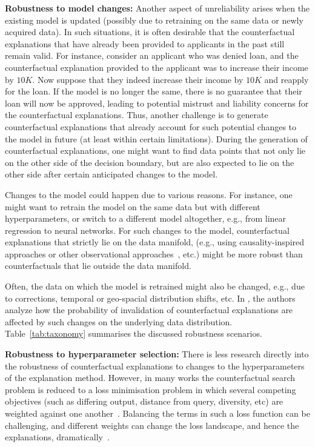 \documentclass[sigconf]{acmart}
\begin{document}
\textbf{Robustness to model changes:} 
Another aspect of unreliability arises when the existing model is updated (possibly due to retraining on the same data or newly acquired data). In such situations, it is often desirable that the counterfactual explanations that have already been provided to applicants in the past still remain valid. For instance, consider an applicant who was denied loan, and the counterfactual explanation provided to the applicant was to increase their income by $10K$. Now suppose that they indeed increase their income by $10K$ and reapply for the loan. If the model is no longer the same, there is no guarantee that their loan will now be approved, leading to potential mistrust and liability concerns for the counterfactual explanations. Thus, another challenge is to generate counterfactual explanations that already account for such potential changes to the model in future (at least within certain limitations). During the generation of counterfactual explanations, one might want to find data points that not only lie on the other side of the decision boundary, but are also expected to lie on the other side after certain anticipated changes to the model.

Changes to the model could happen due to various reasons. For instance, one might want to retrain the model on the same data but with different hyperparameters, or switch to a different model altogether, e.g., from linear regression to neural networks. For such changes to the model, counterfactual explanations that strictly lie on the data manifold, (e.g., using causality-inspired approaches \cite{konig2021causal} or other observational approaches~\cite{poyiadzi2020face}, etc.) might be more robust than counterfactuals that lie outside the data manifold. 

Often, the data on which the model is retrained might also be changed, e.g., due to corrections, temporal or geo-spacial distribution shifts, etc. In \cite{rawal2020can}, the authors analyze how the probability of invalidation of counterfactual explanations are affected by such changes on the underlying data distribution. Table~\ref{tab:taxonomy} summarises the discussed robustness scenarios. 

\textbf{Robustness to hyperparameter selection:} There is less research directly into the robustness of counterfactual explanations to changes to the hyperparameters of the explanation method. However, in many works the counterfactual search problem is reduced to a loss minimisation problem in which several competing objectives (such as differing output, distance from query, diversity, etc) are weighted against one another~\cite{verma2020counterfactual, Karimi_arXiv_2020}. Balancing the terms in such a loss function can be challenging, and different weights can change the loss landscape, and hence the explanations, dramatically~\cite{multiobjective}.
\end{document}

